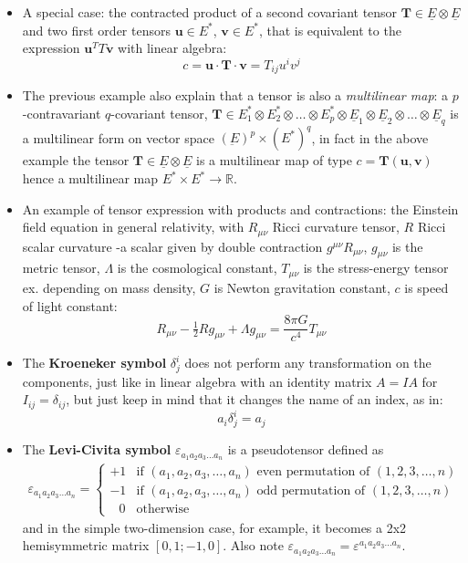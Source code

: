 \documentclass{digitaldynamics}
\def\vect#1{\bm{#1}}
\def\tensor#1{\bm{#1}}
\def\matr#1{{#1}}
\begin{document}
\begin{itemize}
	\item A special case: the contracted product of a second covariant tensor $\tensor{T} \in \underline{E} \otimes \underline{E}$ and two first order tensors $\tensor{u} \in E^*$, $\tensor{v} \in E^*$, that is equivalent to the expression $\vect{u}^T\matr{T}\vect{v}$ with linear algebra:
	\[
	c = \tensor{u} \cdot \tensor{T} \cdot \tensor{v} = T_{ij} u^i v^j
	\]
	
	\item The previous example also explain that a tensor is also a \textit{multilinear map}: a $p$-contravariant $q$-covariant tensor, 
	$\tensor{T}\in E^*_1 \otimes E^*_2 \otimes \ldots \otimes E^*_p \otimes  \underline{E}_1 \otimes \underline{E}_2 \otimes \ldots \otimes \underline{E}_q$ 
	is a multilinear form on vector space 
	$(\underbar{E})^p \times ({E}^*)^q$, 
	in fact in the above example the tensor $\tensor{T}\in \underline{E} \otimes \underline{E} $ is a multilinear map of type $c=\tensor{T}(\tensor{u},\tensor{v})$ hence a multilinear map $E^* \times E^* \rightarrow \mathbb{R}$.
	
	
	\item An example of tensor expression with products and contractions: the Einstein field equation in general relativity, with $R_{\mu \nu}$ Ricci curvature tensor, $R$ Ricci scalar curvature -a scalar given by double contraction $g^{\mu \nu} R_{\mu \nu}$, $g_{\mu \nu}$ is the metric tensor, $\Lambda$ is the cosmological constant, $T_{\mu \nu}$ is the stress-energy tensor ex. depending on mass density, $G$ is Newton gravitation constant, $c$ is speed of light constant:
	\[
	  R_{\mu \nu} - \tfrac{1}{2}R g_{\mu \nu} + \Lambda g_{\mu \nu} = \frac{8 \pi G }{c^4} T_{\mu \nu}
	\]
	
	\item The \textbf{Kroeneker symbol} $\delta^i_j$ does not perform any transformation on the components, just like in linear algebra with an identity matrix $\matr{A}= \matr{I} \matr{A}$ for $I_{ij}=\delta_{ij}$, but just keep in mind that it changes the name of an index, as in:
	\[
	 a_i \delta^i_j = a_j
	\]
	
	\item The \textbf{Levi-Civita symbol} $\varepsilon_{a_1 a_2 a_3 \ldots a_n}$ is a pseudotensor defined as
	\begin{align}
	\varepsilon_{a_1 a_2 a_3 \ldots a_n} =
		\begin{cases}
		+1 & \text{if }(a_1 , a_2 , a_3 , \ldots , a_n) \text{ even permutation of } (1,2,3,\dots,n) \\
		-1 & \text{if }(a_1 , a_2 , a_3 , \ldots , a_n) \text{ odd permutation of } (1,2,3,\dots,n) \\
		\;\;\,0 & \text{otherwise}
		\end{cases}
		\label{eq:levicivita}
	\end{align}
	and in the simple two-dimension case, for example, it becomes a 2x2 hemisymmetric matrix $[0,1;-1,0]$. 
	Also note $\varepsilon_{a_1 a_2 a_3 \ldots a_n} = \varepsilon^{a_1 a_2 a_3 \ldots a_n}$.
	

\end{itemize}
\end{document}
